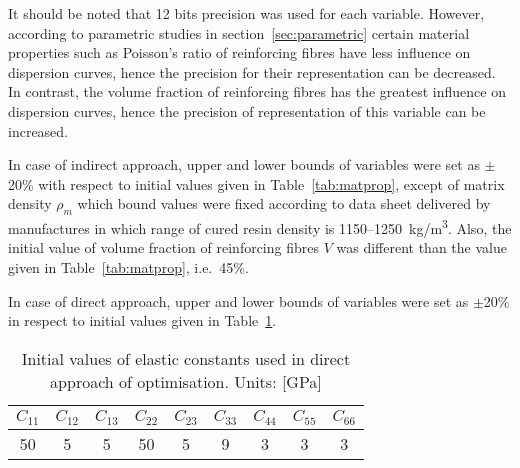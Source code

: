 \documentclass[preprint,12pt]{elsarticle}
\begin{document}
    It should be noted that 12 bits precision was used for each variable. However, according to parametric studies in section~\ref{sec:parametric} certain material properties such as Poisson's ratio of reinforcing fibres have less influence on dispersion curves, hence the precision for their representation can be decreased. In contrast, the volume fraction of reinforcing fibres has the greatest influence on dispersion curves, hence the precision of representation of this variable can be increased.
  
	In case of indirect approach, upper and lower bounds of variables were set as $\pm$20\% with respect to initial values given in Table~\ref{tab:matprop}, except of matrix density $\rho_m$ which bound values were fixed according to data sheet delivered by manufactures in which range of cured resin density is 1150--1250~kg/m\textsuperscript{3}. Also, the initial value of volume fraction of reinforcing fibres $V$ was different than the value given in Table~\ref{tab:matprop},  i.e.~45\%.
	
	In case of direct approach, upper and lower bounds of variables were set as  $\pm$20\% in respect to initial values given in Table~\ref{tab:Ctensor_initial}.
	
	\begin{table}[h!]
		\renewcommand{\arraystretch}{1.3}
		\centering \footnotesize
		\caption{Initial values of elastic constants used in direct approach of optimisation. Units: [GPa]}
		\begin{tabular}{ccccccccc} 
			\toprule
			$C_{11}$ & $C_{12}$ & $C_{13}$  & $C_{22}$ & $C_{23}$ & $C_{33}$ & $C_{44}$  & $C_{55}$ & $C_{66}$ \\
			\midrule
			50 &5& 5&  50 & 5 & 9 & 3 & 3 & 3\\
			\bottomrule 
		\end{tabular} 
		\label{tab:Ctensor_initial}
	\end{table}
\end{document}
